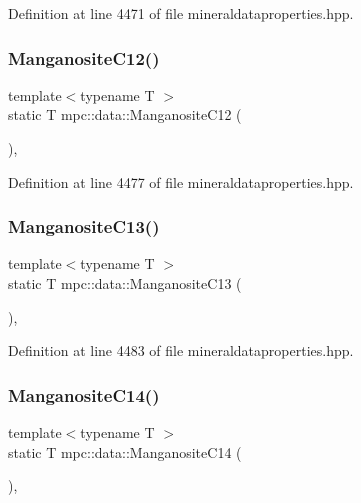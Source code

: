 Definition at line 4471 of file mineraldataproperties.\+hpp.

\mbox{\label{namespacempc_1_1data_a66edd5a400bc2d6937178782a3a3ea12}} 
\subsubsection{\texorpdfstring{Manganosite\+C12()}{ManganositeC12()}}
{\footnotesize\ttfamily template$<$typename T $>$ \\
static T mpc\+::data\+::\+Manganosite\+C12 (\begin{DoxyParamCaption}{ }\end{DoxyParamCaption})\hspace{0.3cm}{\ttfamily [inline]}, {\ttfamily [static]}}



Definition at line 4477 of file mineraldataproperties.\+hpp.

\mbox{\label{namespacempc_1_1data_ae6d7f63dc4c19c2a9f3cefd08cb2caa4}} 
\subsubsection{\texorpdfstring{Manganosite\+C13()}{ManganositeC13()}}
{\footnotesize\ttfamily template$<$typename T $>$ \\
static T mpc\+::data\+::\+Manganosite\+C13 (\begin{DoxyParamCaption}{ }\end{DoxyParamCaption})\hspace{0.3cm}{\ttfamily [inline]}, {\ttfamily [static]}}



Definition at line 4483 of file mineraldataproperties.\+hpp.

\mbox{\label{namespacempc_1_1data_af2eeaca48ce62f2dc7f7b2c072d9c17a}} 
\subsubsection{\texorpdfstring{Manganosite\+C14()}{ManganositeC14()}}
{\footnotesize\ttfamily template$<$typename T $>$ \\
static T mpc\+::data\+::\+Manganosite\+C14 (\begin{DoxyParamCaption}{ }\end{DoxyParamCaption})\hspace{0.3cm}{\ttfamily [inline]}, {\ttfamily [static]}}




